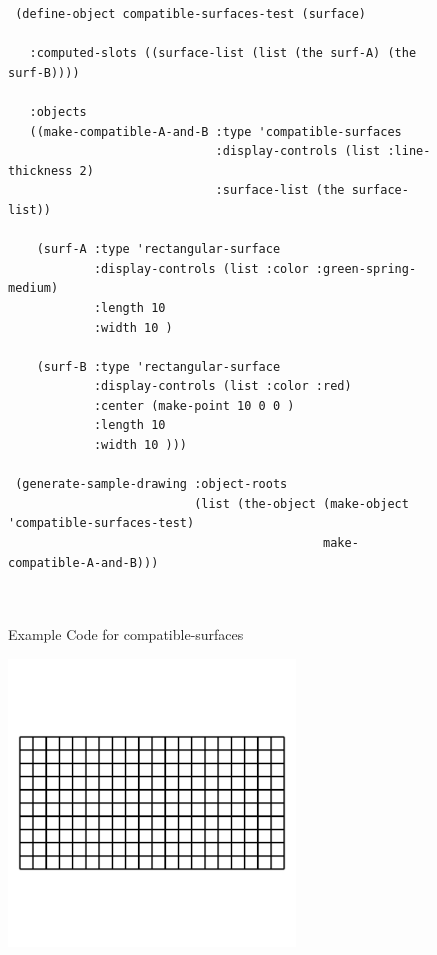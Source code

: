 \documentclass [11pt]{book}
\begin{document}
\begin{itemize}
\begin{figure}
\begin{lrbox}{\boxedverb}
\begin{minipage}{\linewidth}
{\begin{verbatim}
 (define-object compatible-surfaces-test (surface) 

   :computed-slots ((surface-list (list (the surf-A) (the surf-B))))
  
   :objects
   ((make-compatible-A-and-B :type 'compatible-surfaces
                             :display-controls (list :line-thickness 2)
                             :surface-list (the surface-list))

    (surf-A :type 'rectangular-surface
            :display-controls (list :color :green-spring-medium)
            :length 10
            :width 10 )
                                        
    (surf-B :type 'rectangular-surface
            :display-controls (list :color :red)
            :center (make-point 10 0 0 )
            :length 10
            :width 10 )))

 (generate-sample-drawing :object-roots 
                          (list (the-object (make-object 'compatible-surfaces-test) 
                                            make-compatible-A-and-B)))
 
 
\end{verbatim}}
\end{minipage}
\end{lrbox}
\fbox{\usebox{\boxedverb}}

\caption{Example Code for compatible-surfaces}

\label{fig:example-code-compatible-surfaces}

\end{figure}

\begin{figure}
\begin{center}
\includegraphics[width=3in,height=3in]{../images/example-compatible-surfaces.pdf}
\end{center}


\end{figure}
\end{itemize}
\end{document}
